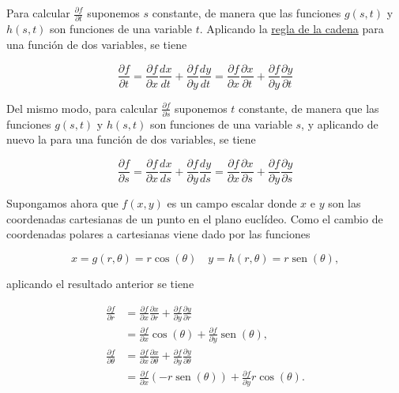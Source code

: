 \documentclass[
  a4paper,
]{scrreport}
\theoremstyle{definition}
\theoremstyle{remark}
\begin{document}
\begin{tcolorbox}[enhanced jigsaw, left=2mm, coltitle=black, colbacktitle=quarto-callout-tip-color!10!white, opacitybacktitle=0.6, colback=white, breakable, titlerule=0mm, toptitle=1mm, rightrule=.15mm, bottomtitle=1mm, bottomrule=.15mm, toprule=.15mm, leftrule=.75mm, arc=.35mm, opacityback=0, title=\textcolor{quarto-callout-tip-color}{\faLightbulb}\hspace{0.5em}{Solución}, colframe=quarto-callout-tip-color-frame]

Para calcular \(\frac{\partial f}{\partial t}\) suponemos \(s\)
constante, de manera que las funciones \(g(s,t)\) y \(h(s,t)\) son
funciones de una variable \(t\). Aplicando la
\href{https://aprendeconalf.es/analisis-manual/13-derivadas-funciones-varias-variables.html\#regla-de-la-cadena}{regla
de la cadena} para una función de dos variables, se tiene

\[
\frac{\partial f}{\partial t} 
= \frac{\partial f}{\partial x}\frac{dx}{dt} + \frac{\partial f}{\partial y}\frac{dy}{dt} 
= \frac{\partial f}{\partial x}\frac{\partial x}{\partial t} + \frac{\partial f}{\partial y}\frac{\partial y}{\partial t}
\]

Del mismo modo, para calcular \(\frac{\partial f}{\partial s}\)
suponemos \(t\) constante, de manera que las funciones \(g(s,t)\) y
\(h(s,t)\) son funciones de una variable \(s\), y aplicando de nuevo la
para una función de dos variables, se tiene

\[
\frac{\partial f}{\partial s} 
= \frac{\partial f}{\partial x}\frac{dx}{ds} + \frac{\partial f}{\partial y}\frac{dy}{ds} 
= \frac{\partial f}{\partial x}\frac{\partial x}{\partial s} + \frac{\partial f}{\partial y}\frac{\partial y}{\partial s}
\]

Supongamos ahora que \(f(x,y)\) es un campo escalar donde \(x\) e \(y\)
son las coordenadas cartesianas de un punto en el plano euclídeo. Como
el cambio de coordenadas polares a cartesianas viene dado por las
funciones

\[
x = g(r,\theta) = r\cos(\theta) \quad y = h(r,\theta) = r\operatorname{sen}(\theta),
\]

aplicando el resultado anterior se tiene

\begin{align*}
\frac{\partial f}{\partial r} 
&= \frac{\partial f}{\partial x}\frac{\partial x}{\partial r} + \frac{\partial f}{\partial y}\frac{\partial y}{\partial r} \\
&= \frac{\partial f}{\partial x}\cos(\theta) + \frac{\partial f}{\partial y}\operatorname{sen}(\theta), \\
\frac{\partial f}{\partial \theta} 
&= \frac{\partial f}{\partial x}\frac{\partial x}{\partial \theta} + \frac{\partial f}{\partial y}\frac{\partial y}{\partial \theta} \\
&= \frac{\partial f}{\partial x}(-r\operatorname{sen}(\theta)) + \frac{\partial f}{\partial y}r\cos(\theta).
\end{align*}

\end{tcolorbox}
\end{document}
